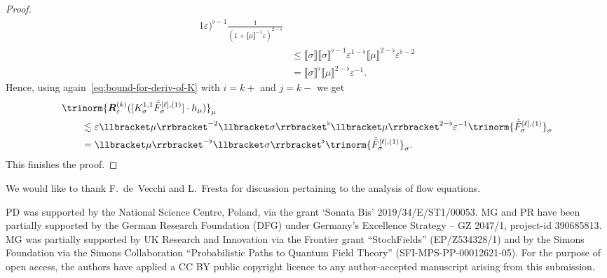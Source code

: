\documentclass{article}
\numberwithin{equation}{section}
\theoremstyle{plain}
\theoremstyle{definition}
\begin{document}
\begin{proof}
\begin{align*}
{{    1}  \varepsilon)^{\flat - 1}} \frac{1}{{(1 + \llbracket \mu \rrbracket^{-
    1}  \varepsilon)^{2 - \flat}} }\\
 &\leqslant  \llbracket \sigma \rrbracket  \llbracket \sigma
    \rrbracket^{\flat - 1} \varepsilon^{1 - \flat} \llbracket \mu
    \rrbracket^{2 - \flat} {\varepsilon^{\flat - 2}} \\
 &=  \llbracket \sigma \rrbracket^{\flat} \llbracket \mu \rrbracket^{2 -
    \flat} \varepsilon^{- 1} .
  \end{align*}
  Hence, using again~\eqref{eq:bound-for-deriv-of-K} with $i = k +$ and $j = k
  -$ we get
  \begin{align*}
     &\trinorm{ \boldsymbol{R}_{\varepsilon}^{(k)} ([K^{1, 1}_{\sigma}
     \dot{\bar{F}}_{\sigma}^{[\ell], (1)}] \cdot h_{\mu}) }_{\mu}\\
     &\qquad \lesssim \varepsilon \llbracket \mu \rrbracket^{- 2}
     \llbracket \sigma \rrbracket^{\flat}
     \llbracket \mu \rrbracket^{2 - \flat} \varepsilon^{- 1}
     \trinorm{ \dot{\bar{F}}_{\sigma}^{[\ell], (1)} }_{\sigma}\\
     &\qquad =
     \llbracket \mu \rrbracket^{- \flat} \llbracket \sigma \rrbracket^{\flat}
     \trinorm{ \dot{\bar{F}}_{\sigma}^{[\ell], (1)}
     }_{\sigma} .
  \end{align*}
  This finishes the proof.
\end{proof}


\begin{ack}
We would like to thank F.~de~Vecchi and L.~Fresta for discussion pertaining to the analysis of flow equations.
\end{ack}

\begin{funding}
PD was supported by the National Science Centre, Poland, via the grant `Sonata
Bis' 2019/34/E/ST1/00053.  MG and PR have been partially supported by the German Research Foundation (DFG)
under Germany's Excellence Strategy -- GZ 2047/1, project-id 390685813. MG was partially supported by UK Research and
Innovation via the Frontier grant ``StochFields'' (EP/Z534328/1) and by the Simons
Foundation via the Simons Collaboration ``Probabilistic Paths to Quantum Field
Theory'' (SFI-MPS-PP-00012621-05).  For the purpose of open access, the authors
have applied a CC BY public copyright licence to any author-accepted manuscript
arising from this submission.
\end{funding}



\end{document}
